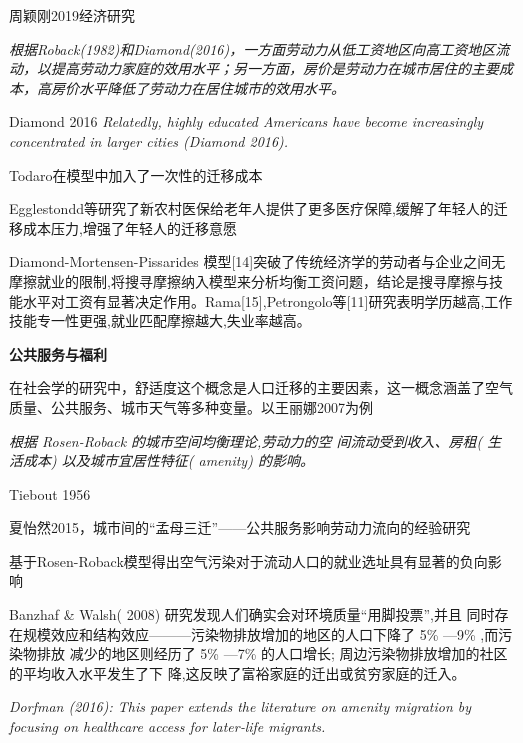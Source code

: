 \documentclass[a4paper,12pt]{article}
\begin{document}
周颖刚2019经济研究\cite{ZhouYingGangGaoFangJieJiChuLiaoShuiJiYuZhongGuoLiuDongRenKouDeWeiGuanShiJiao2019}

\textit{根据Roback(1982)和Diamond(2016)，一方面劳动力从低工资地区向高工资地区流动，以提高劳动力家庭的效用水平；另一方面，房价是劳动力在城市居住的主要成本，高房价水平降低了劳动力在居住城市的效用水平。}

Diamond 2016\cite{diamondDeterminantsWelfareImplications2016} \textit{Relatedly, highly educated Americans have become increasingly concentrated in larger cities (Diamond 2016).}

Todaro在模型中加入了一次性的迁移成本

Egglestondd等研究了新农村医保给老年人提供了更多医疗保障,缓解了年轻人的迁移成本压力,增强了年轻人的迁移意愿

Diamond-Mortensen-Pissarides 模型[14]突破了传统经济学的劳动者与企业之间无摩擦就业的限制,将搜寻摩擦纳入模型来分析均衡工资问题，结论是搜寻摩擦与技能水平对工资有显著决定作用。Rama[15],Petrongolo等[11]研究表明学历越高,工作技能专一性更强,就业匹配摩擦越大,失业率越高。












\textbf{公共服务与福利}

在社会学的研究中，舒适度这个概念是人口迁移的主要因素，这一概念涵盖了空气质量、公共服务、城市天气等多种变量。以王丽娜2007为例

\textit{根据 Rosen-Roback 的城市空间均衡理论,劳动力的空 间流动受到收入、房租( 生活成本) 以及城市宜居性特征( amenity) 的影响。}

Tiebout 1956

夏怡然2015，城市间的“孟母三迁”——公共服务影响劳动力流向的经验研究
\cite{XiaYiRanChengShiJianDeMengMuSanQianGongGongFuWuYingXiangLaoDongLiLiuXiangDeJingYanYanJiu2015}

\cite{SunWeiZengKongQiWuRanYuLaoDongLiDeKongJianLiuDongJiYuLiuDongRenKouJiuYeXuanZhiXingWeiDeYanJiu2019}
基于Rosen-Roback模型得出空气污染对于流动人口的就业选址具有显著的负向影响

Banzhaf \& Walsh( 2008) 研究发现人们确实会对环境质量“用脚投票”,并且 同时存在规模效应和结构效应———污染物排放增加的地区的人口下降了 5\% —9\% ,而污染物排放 减少的地区则经历了 5\% —7\% 的人口增长; 周边污染物排放增加的社区的平均收入水平发生了下 降,这反映了富裕家庭的迁出或贫穷家庭的迁入。


\textit{Dorfman (2016): This paper extends the literature on amenity migration by focusing on healthcare access for later‐life migrants.}
\end{document}
